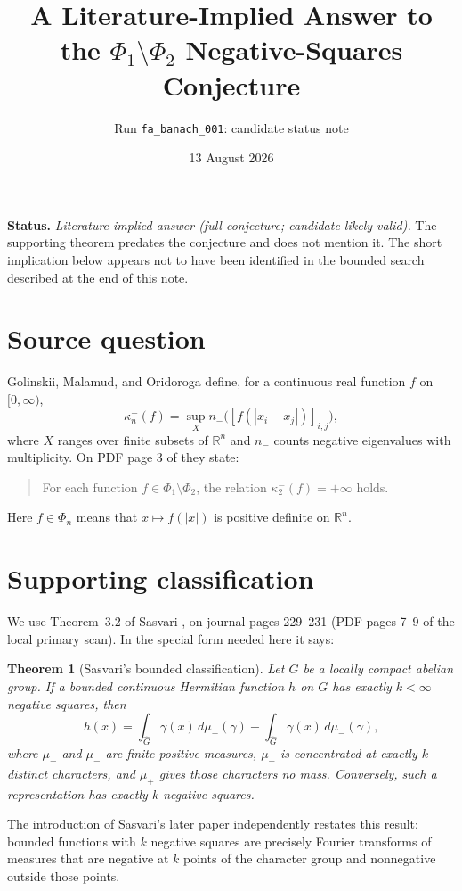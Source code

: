 \documentclass[11pt]{article}
\title{A Literature-Implied Answer to the $\Phi_1\setminus\Phi_2$
Negative-Squares Conjecture}
\author{Run \texttt{fa\_banach\_001}: candidate status note}
\date{13 August 2026}
\newtheorem{theorem}{Theorem}
\newcommand{\R}{\mathbb R}
\begin{document}
\maketitle

\noindent\textbf{Status.}
\emph{Literature-implied answer (full conjecture; candidate likely valid).}
The supporting theorem predates the conjecture and does not mention it.  The
short implication below appears not to have been identified in the bounded
search described at the end of this note.

\section{Source question}

Golinskii, Malamud, and Oridoroga define, for a continuous real function
$f$ on $[0,\infty)$,
\[
 \kappa_n^-(f)=\sup_X n_-\bigl([f(|x_i-x_j|)]_{i,j}\bigr),
\]
where $X$ ranges over finite subsets of $\R^n$ and $n_-$ counts negative
eigenvalues with multiplicity.  On PDF page 3 of
\cite{GMO} they state:
\begin{quote}
For each function $f\in\Phi_1\setminus\Phi_2$, the relation
$\kappa_2^-(f)=+\infty$ holds.
\end{quote}
Here $f\in\Phi_n$ means that $x\mapsto f(|x|)$ is positive definite on
$\R^n$.

\section{Supporting classification}

We use Theorem~3.2 of Sasvari \cite{Sasvari1985}, on journal pages
229--231 (PDF pages 7--9 of the local primary scan).  In the
special form needed here it says:

\begin{theorem}[Sasvari's bounded classification]\label{thm:sasvari}
Let $G$ be a locally compact abelian group.  If a bounded continuous
Hermitian function $h$ on $G$ has exactly $k<\infty$ negative squares,
then
\[
 h(x)=\int_{\widehat G}\gamma(x)\,d\mu_+(\gamma)
      -\int_{\widehat G}\gamma(x)\,d\mu_-(\gamma),
\]
where $\mu_+$ and $\mu_-$ are finite positive measures, $\mu_-$ is
concentrated at exactly $k$ distinct characters, and $\mu_+$ gives those
characters no mass.  Conversely, such a representation has exactly $k$
negative squares.
\end{theorem}

The introduction of Sasvari's later paper \cite[p.~319]{Sasvari1989}
independently restates this result: bounded functions with $k$ negative
squares are precisely Fourier transforms of measures that are negative at
$k$ points of the character group and nonnegative outside those points.
\end{document}
